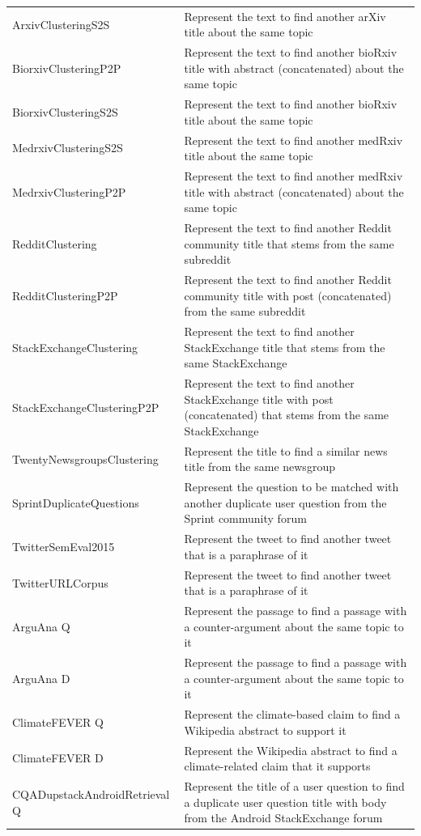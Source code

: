 \documentclass{article}
\begin{document}
\begin{longtable}{lp{9cm}}
ArxivClusteringS2S & Represent the text to find another arXiv title about the same topic \\
BiorxivClusteringP2P & Represent the text to find another bioRxiv title with abstract (concatenated) about the same topic \\
BiorxivClusteringS2S & Represent the text to find another bioRxiv title about the same topic \\
MedrxivClusteringS2S & Represent the text to find another medRxiv title about the same topic \\
MedrxivClusteringP2P & Represent the text to find another medRxiv title with abstract (concatenated) about the same topic \\
RedditClustering & Represent the text to find another Reddit community title that stems from the same subreddit \\
RedditClusteringP2P & Represent the text to find another Reddit community title with post (concatenated) from the same subreddit \\
StackExchangeClustering & Represent the text to find another StackExchange title that stems from the same StackExchange \\
StackExchangeClusteringP2P & Represent the text to find another StackExchange title with post (concatenated) that stems from the same StackExchange \\
TwentyNewsgroupsClustering & Represent the title to find a similar news title from the same newsgroup \\
\midrule
SprintDuplicateQuestions & Represent the question to be matched with another duplicate user question from the Sprint community forum \\
TwitterSemEval2015 & Represent the tweet to find another tweet that is a paraphrase of it \\
TwitterURLCorpus & Represent the tweet to find another tweet that is a paraphrase of it \\
\midrule
ArguAna Q & Represent the passage to find a passage with a counter-argument about the same topic to it \\
ArguAna D & Represent the passage to find a passage with a counter-argument about the same topic to it \\
ClimateFEVER Q & Represent the climate-based claim to find a Wikipedia abstract to support it \\
ClimateFEVER D & Represent the Wikipedia abstract to find a climate-related claim that it supports \\
CQADupstackAndroidRetrieval Q & Represent the title of a user question to find a duplicate user question title with body from the Android StackExchange forum \\

\end{longtable}
\end{document}
